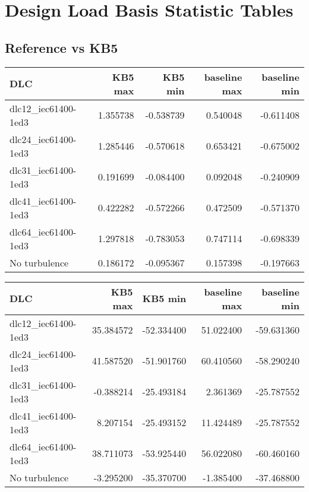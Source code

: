 \chapter{Design Load Basis Statistic Tables}
\section{Reference vs KB5}
\label{tables:baseline-vs-KB6}


\begin{tabular}{lrrrr}
\toprule
                 DLC &   KB5 max &   KB5 min &  baseline max &  baseline min \\
\midrule
 dlc12\_iec61400-1ed3 &  1.355738 & -0.538739 &      0.540048 &     -0.611408 \\
 dlc24\_iec61400-1ed3 &  1.285446 & -0.570618 &      0.653421 &     -0.675002 \\
 dlc31\_iec61400-1ed3 &  0.191699 & -0.084400 &      0.092048 &     -0.240909 \\
 dlc41\_iec61400-1ed3 &  0.422282 & -0.572266 &      0.472509 &     -0.571370 \\
 dlc64\_iec61400-1ed3 &  1.297818 & -0.783053 &      0.747114 &     -0.698339 \\
        No turbulence &  0.186172 & -0.095367 &      0.157398 &     -0.197663 \\
\bottomrule
\end{tabular}


\begin{tabular}{lrrrr}
\toprule
                 DLC &    KB5 max &    KB5 min &  baseline max &  baseline min \\
\midrule
 dlc12\_iec61400-1ed3 &  35.384572 & -52.334400 &     51.022400 &    -59.631360 \\
 dlc24\_iec61400-1ed3 &  41.587520 & -51.901760 &     60.410560 &    -58.290240 \\
 dlc31\_iec61400-1ed3 &  -0.388214 & -25.493184 &      2.361369 &    -25.787552 \\
 dlc41\_iec61400-1ed3 &   8.207154 & -25.493152 &     11.424489 &    -25.787552 \\
 dlc64\_iec61400-1ed3 &  38.711073 & -53.925440 &     56.022080 &    -60.460160 \\
        No turbulence &  -3.295200 & -35.370700 &     -1.385400 &    -37.468800 \\
\bottomrule
\end{tabular}


